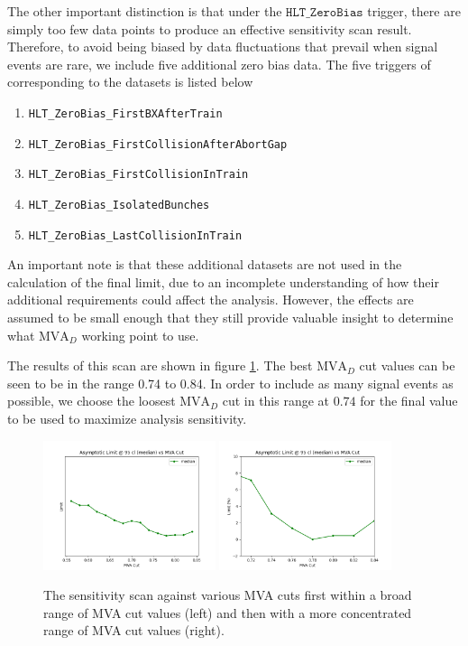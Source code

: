 The other important distinction is that under the $\texttt{HLT\_ZeroBias}$ trigger, there are simply too few data points to produce an effective sensitivity scan result. Therefore, to avoid being biased by data fluctuations that prevail when signal events are rare, we include five additional zero bias data. The five triggers of corresponding to the datasets is listed below
\begin{enumerate}
    \item \texttt{HLT\_ZeroBias\_FirstBXAfterTrain}
    \item \texttt{HLT\_ZeroBias\_FirstCollisionAfterAbortGap}
    \item \texttt{HLT\_ZeroBias\_FirstCollisionInTrain}
    \item \texttt{HLT\_ZeroBias\_IsolatedBunches}
    \item \texttt{HLT\_ZeroBias\_LastCollisionInTrain}
\end{enumerate}
An important note is that these additional datasets are not used in the calculation of the final limit, due to an incomplete understanding of how their additional requirements could affect the analysis. However, the effects are assumed to be small enough that they still provide valuable insight to determine what $\text{MVA}_D$ working point to use. 

The results of this scan are shown in figure \ref{fig:sensitivity_scan}. The best $\text{MVA}_D$ cut values can be seen to be in the range 0.74 to 0.84. In order to include as many signal events as possible, we choose the loosest $\text{MVA}_D$ cut in this range at $0.74$ for the final value to be used to maximize analysis sensitivity. 

\begin{figure}[h!]
    \begin{center}
      \includegraphics[width=0.45\textwidth]{figures/chapter4/results/limit_bdt_median.png}
      \includegraphics[width=0.45\textwidth]{figures/chapter4/results/limit_bdt_median_v2.png}\\
    \end{center}
    \caption{
      The sensitivity scan against various MVA cuts first within a broad range of MVA cut values (left) and then with a more concentrated range of MVA cut values (right).
    }
    \label{fig:sensitivity_scan}
\end{figure}

